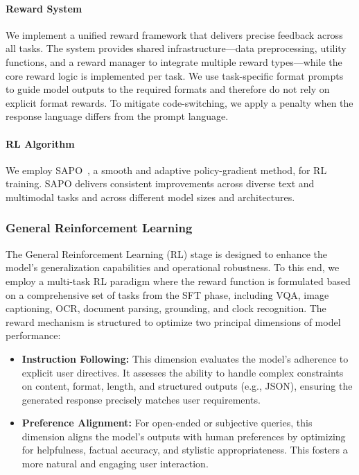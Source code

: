 \documentclass{article} %
\begin{document}
\paragraph{Reward System}
We implement a unified reward framework that delivers precise feedback across all tasks. The system provides shared infrastructure—data preprocessing, utility functions, and a reward manager to integrate multiple reward types—while the core reward logic is implemented per task. We use task-specific format prompts to guide model outputs to the required formats and therefore do not rely on explicit format rewards. To mitigate code-switching, we apply a penalty when the response language differs from the prompt language.

\paragraph{RL Algorithm}
We employ SAPO~\citep{sapo}, a smooth and adaptive policy-gradient method, for RL training. SAPO delivers consistent improvements across diverse text and multimodal tasks and across different model sizes and architectures.

\subsubsection{General Reinforcement Learning}

The General Reinforcement Learning (RL) stage is designed to enhance the model's generalization capabilities and operational robustness. To this end, we employ a multi-task RL paradigm where the reward function is formulated based on a comprehensive set of tasks from the SFT phase, including VQA, image captioning, OCR, document parsing, grounding, and clock recognition. The reward mechanism is structured to optimize two principal dimensions of model performance:

\begin{itemize}[itemindent=0pt, labelsep=4pt, leftmargin=*]
\item \textbf{Instruction Following:} This dimension evaluates the model's adherence to explicit user directives. It assesses the ability to handle complex constraints on content, format, length, and structured outputs (e.g., JSON), ensuring the generated response precisely matches user requirements.

\item \textbf{Preference Alignment:} For open-ended or subjective queries, this dimension aligns the model's outputs with human preferences by optimizing for helpfulness, factual accuracy, and stylistic appropriateness. This fosters a more natural and engaging user interaction.

\end{itemize}
\end{document}
